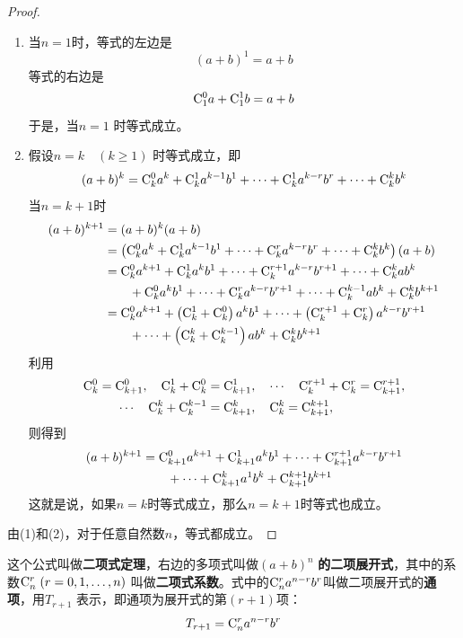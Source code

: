 \begin{proof}
\begin{enumerate}[(1)]
    \item 当$ n=1 $时，等式的左边是
\[(a+b)^{1}=a+b\]
等式的右边是
\[\comb{1}{0}a+\comb{1}{1}b=a+b\]
于是，当$n=1$ 时等式成立。

\item 假设$n=k\quad (k\ge 1)$ 时等式成立，即
\[
(a+b)^{k}=\comb{k}{0}a^{k}+\comb{k}{1}a^{k-1}b^{1}+\cdots+\comb{k}{1}a^{k-r}b^{r}+\cdots+\comb{k}{k}b^{k}\]
当$ n=k+1 $时
\[\begin{split}
    (a+b)^{k+1}& =(a+b)^{k}(a+b)\\
    &=\left(\comb{k}{0}a^{k}+\comb{k}{1}a^{k-1}b^{1}+\cdots+\comb{k}{r}a^{k-r}b^{r}+\cdots+\comb{k}{k}b^{k}\right)(a+b)\\
    & =\comb{k}{0}a^{k+1}+\comb{k}{1}a^{k}b^{1}+\cdots+\comb{k}{r+1}a^{k-r}b^{r+1}+\cdots+\comb{k}{k}ab^{k}\\
    &\qquad  +\comb{k}{0}a^{k}b^{1}+\cdots+\comb{k}{r}a^{k-r}b^{r+1}+\cdots+\comb{k}{k-1}ab^{k}+\comb{k}{k}b^{k+1}\\
    & =\comb{k}{0}a^{k+1}+\left(\comb{k}{1}+\comb{k}{0}\right)a^{k}b^{1}+\cdots+\left(\comb{k}{r+1}+\comb{k}{r}\right)a^{k-r}b^{r+1}\\
    &\qquad  +\cdots+\left(\comb{k}{k}+\comb{k}{k-1}\right)ab^{k}+\comb{k}{k}b^{k+1}
\end{split}\]
利用
\[\begin{split}
\comb{k}{0}=\comb{k+1}{0},\quad  \comb{k}{1}+\comb{k}{0}&=\comb{k+1}{1},\quad \cdots \quad \comb{k}{r+1}+\comb{k}{r}=\comb{k+1}{r+1},\\
\quad \cdots\quad  \comb{k}{k}+\comb{k}{k-1}&=\comb{k+1}{k},\quad \comb{k}{k}=\comb{k+1}{k+1}, 
\end{split}\]
则得到
\[\begin{split}
(a+b)^{k+1}&=\comb{k+1}{0}a^{k+1}+\comb{k+1}{1}a^{k}b^{1}+\cdots+\comb{k+1}{r+1}a^{k-r}b^{r+1}\\
&\qquad +\cdots +\comb{k+1}{k}a^{1}b^{k}+\comb{k+1}{k+1}b^{k+1}    
\end{split}
\]
这就是说，如果$ n=k $时等式成立，那么$ n=k+1 $时等式也成立。
\end{enumerate}

由(1)和(2)，对于任意自然数$n$，等式都成立。
\end{proof}


这个公式叫做\textbf{二项式定理}，右边的多项式叫做$(a+b)^{n}$ \textbf{的二项展开式}，其中的系数$\comb{n}{r}\; (r=0,1,\ldots,n)$ 叫做\textbf{二项式系数}。式中的$ \comb{n}{r}a^{n-r}b^{r} $叫做二项展开式的\textbf{通项}，用$T_{r+1}$ 表示，即通项为展开式的第$( r+1 )$项：
\[T_{r+1}=\comb{n}{r}a^{n-r}b^{r}\]

